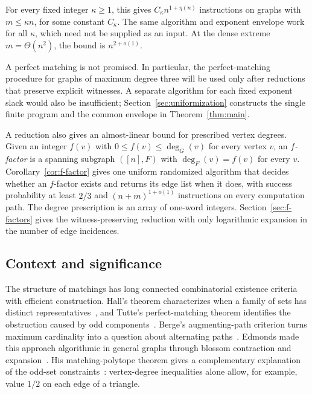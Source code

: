 For every fixed integer $\kappa\ge1$, this gives
$C_\kappa n^{1+\eta(n)}$ instructions on graphs with $m\le\kappa n$, for
some constant $C_\kappa$. The same algorithm and exponent envelope work for
all $\kappa$, which need not be supplied as an input. At the dense extreme
$m=\Theta(n^2)$, the bound is $n^{2+o(1)}$.

A perfect matching is not promised. In particular, the perfect-matching
procedure for graphs of maximum degree three will be used only after
reductions that preserve explicit witnesses. A separate algorithm for each fixed exponent slack
would also be insufficient; Section~\ref{sec:uniformization} constructs the
single finite program and the common envelope in Theorem~\ref{thm:main}.

A reduction also gives an almost-linear bound for prescribed vertex degrees. Given an
integer $f(v)$ with $0\le f(v)\le\deg_G(v)$ for every vertex $v$, an
\emph{$f$-factor} is a spanning subgraph $([n],F)$ with
$\deg_F(v)=f(v)$ for every $v$. Corollary~\ref{cor:f-factor} gives one
uniform randomized algorithm that decides whether an $f$-factor exists and
returns its edge list when it does, with success probability at least $2/3$
and $(n+m)^{1+o(1)}$ instructions on every computation path. The degree
prescription is an array of one-word integers. Section~\ref{sec:f-factors}
gives the witness-preserving reduction with only logarithmic expansion in
the number of edge incidences.

\subsection{Context and significance}

The structure of matchings has long connected combinatorial existence
criteria with efficient construction. Hall's theorem characterizes when
a family of sets has distinct representatives~\cite{Hall1935}, and Tutte's
perfect-matching theorem identifies the obstruction caused by odd
components~\cite{Tutte1947}. Berge's augmenting-path criterion turns
maximum cardinality into a question about alternating
paths~\cite{Berge1957}. Edmonds made this approach algorithmic in general
graphs through blossom contraction and expansion~\cite{EdmondsPaths}.
His matching-polytope theorem gives a complementary explanation of the
odd-set constraints~\cite{EdmondsPolytope}: vertex-degree inequalities
alone allow, for example, value $1/2$ on each edge of a triangle.

